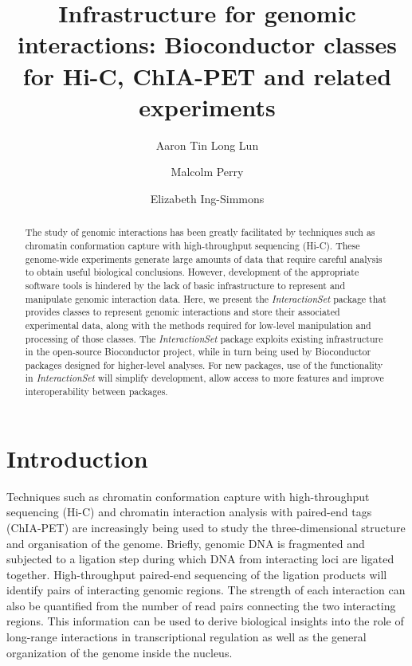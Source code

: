 \documentclass[10pt,a4paper,twocolumn]{article}
\begin{document}
\title{Infrastructure for genomic interactions: Bioconductor classes for Hi-C, ChIA-PET and related experiments}

\author[1]{Aaron Tin Long Lun}
\author[2]{Malcolm Perry}
\author[2]{Elizabeth Ing-Simmons}

\maketitle
\thispagestyle{fancy}

\begin{abstract}
The study of genomic interactions has been greatly facilitated by techniques such as chromatin conformation capture with high-throughput sequencing (Hi-C).
These genome-wide experiments generate large amounts of data that require careful analysis to obtain useful biological conclusions.
However, development of the appropriate software tools is hindered by the lack of basic infrastructure to represent and manipulate genomic interaction data.
Here, we present the \textit{InteractionSet} package that provides classes to represent genomic interactions and store their associated experimental data, along with the methods required for low-level manipulation and processing of those classes.
The \textit{InteractionSet} package exploits existing infrastructure in the open-source Bioconductor project, while in turn being used by Bioconductor packages designed for higher-level analyses.
For new packages, use of the functionality in \textit{InteractionSet} will simplify development, allow access to more features and improve interoperability between packages.
\end{abstract}

\clearpage
\newcommand{\code}[1]{{\small\texttt{#1}}}

\section*{Introduction}
Techniques such as chromatin conformation capture with high-throughput sequencing (Hi-C) \cite{aiden2009comprehensive} and chromatin interaction analysis with paired-end tags (ChIA-PET) \cite{fullwood2009oestrogen} are increasingly being used to study the three-dimensional structure and organisation of the genome.
Briefly, genomic DNA is fragmented and subjected to a ligation step during which DNA from interacting loci are ligated together.
High-throughput paired-end sequencing of the ligation products will identify pairs of interacting genomic regions.
The strength of each interaction can also be quantified from the number of read pairs connecting the two interacting regions.
This information can be used to derive biological insights into the role of long-range interactions in transcriptional regulation as well as the general organization of the genome inside the nucleus.
\end{document}
